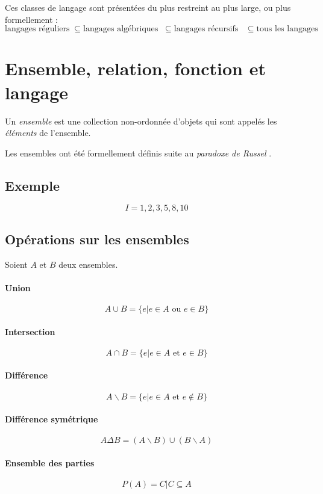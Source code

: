 \documentclass[12pt, a4paper]{report}
\begin{document}
Ces classes de langage sont présentées du plus restreint au plus large, ou
plus formellement :
\[
\text{langages réguliers}
\;\subseteq\text{langages algébriques}
\;\;\subseteq\text{langages récursifs}
\;\;\;\subseteq\text{tous les langages}
\]

\section{Ensemble, relation, fonction et langage}


Un \textit{ensemble} est une collection non-ordonnée d'objets qui sont
appelés les \textit{éléments} de l'ensemble.

Les ensembles ont été formellement définis suite au \textit{paradoxe
  de Russel} .

\subsection{Exemple}

\[
I = {1, 2, 3, 5, 8, 10}
\]


\subsection{Opérations sur les ensembles}

Soient $A$ et $B$ deux ensembles.

\paragraph{Union}
\[ A \cup B = \{ e | e \in A \textrm{ ou } e \in B \} \]

\paragraph{Intersection}
\[ A \cap B = \{ e | e \in A \textrm{ et } e \in B \} \]

\paragraph{Différence}
\[ A \backslash B = \{ e | e \in A \textrm{ et } e \not\in B \} \]

\paragraph{Différence symétrique}
\[ A \Delta B = (A \backslash B)\cup (B \backslash A) \]

\paragraph{Ensemble des parties}
\[ P(A) = { C | C \subseteq A} \]
\end{document}

